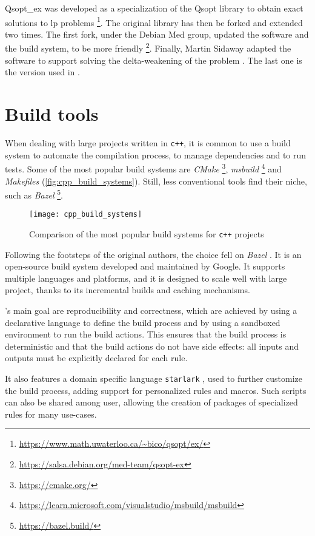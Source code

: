 Qsopt\_ex was developed as a specialization of the Qsopt library to obtain exact solutions to \gls{lp} problems \footnote{\url{https://www.math.uwaterloo.ca/~bico/qsopt/ex/}}.
The original library has then be forked and extended two times.
The first fork, under the Debian Med group, updated the software and the build system, to be more friendly \footnote{\url{https://salsa.debian.org/med-team/qsopt-ex}}.
Finally, Martin Sidaway adapted the software to support solving the delta-weakening of the problem \cite{repo:qsopt-ex}.
The last one is the version used in \dlinear.

\section{Build tools}

When dealing with large projects written in \texttt{c++}, it is common to use a build system to automate the compilation process, to manage dependencies and to run tests.
Some of the most popular build systems are \textit{CMake} \footnote{\url{https://cmake.org/}}, \textit{msbuild} \footnote{\url{https://learn.microsoft.com/visualstudio/msbuild/msbuild}} and \textit{Makefiles} (\autoref{fig:cpp_build_systems}).
Still, less conventional tools find their niche, such as \textit{Bazel} \footnote{\url{https://bazel.build/}}.

\begin{figure}[h]
    \centering
    \texttt{[image: cpp\_build\_systems]}
    \caption{Comparison of the most popular build systems for \texttt{c++} projects \cite{art:cpp-build-system}}\label{fig:cpp_build_systems}
\end{figure}

Following the footsteps of the original authors, the choice fell on \textit{Bazel} \cite{repo:bazel}.
It is an open-source build system developed and maintained by Google.
It supports multiple languages and platforms, and it is designed to scale well with large project, thanks to its incremental builds and caching mechanisms.

\bazel's main goal are reproducibility and correctness, which are achieved by using a declarative language to define the build process and by using a sandboxed environment to run the build actions.
This ensures that the build process is deterministic and that the build actions do not have side effects: all inputs and outputs must be explicitly declared for each rule.

It also features a domain specific language \texttt{starlark} \cite{repo:starlark}, used to further customize the build process, adding support for personalized rules and macros.
Such scripts can also be shared among user, allowing the creation of packages of specialized rules for many use-cases.

